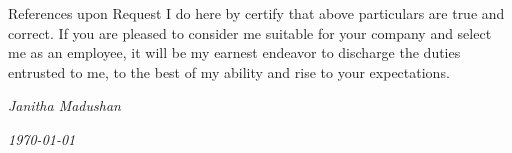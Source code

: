 \documentclass[]{cv-class}
\begin{document}
\begin{entrylist}
  \entry
    {}
    {}
    {}
    {References upon Request}
  \entry
    {}
    {}
    {}
    {I do here by certify that above particulars are true and correct. If you are pleased to consider me 
	suitable for your company and select me as an employee, it will be my earnest endeavor to discharge 
	the duties entrusted to me, to the best of my ability and rise to your expectations.}
\end{entrylist}

\begin{flushright}
\emph{Janitha Madushan}
\end{flushright}
\begin{flushright}
\emph{\today}
\end{flushright}
\end{document}
